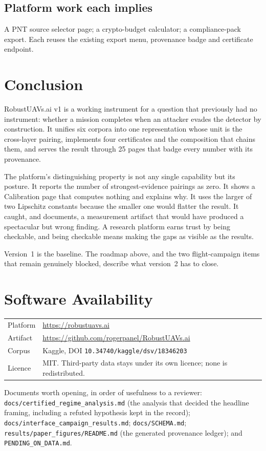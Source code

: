 \documentclass[11pt,a4paper]{article}
\newcommand{\code}[1]{\texttt{#1}}
\begin{document}
\subsection{Platform work each implies}
A PNT source selector page; a crypto-budget calculator; a compliance-pack
export. Each reuses the existing export menu, provenance badge and certificate
endpoint.

\section{Conclusion}

RobustUAVs.ai v1 is a working instrument for a question that previously had no
instrument: whether a mission completes when an attacker evades the detector by
construction. It unifies six corpora into one representation whose unit is the
cross-layer pairing, implements four certificates and the composition that
chains them, and serves the result through 25 pages that badge every number with
its provenance.

The platform's distinguishing property is not any single capability but its
posture. It reports the number of strongest-evidence pairings as zero. It shows
a Calibration page that computes nothing and explains why. It uses the larger of
two Lipschitz constants because the smaller one would flatter the result. It
caught, and documents, a measurement artifact that would have produced a
spectacular but wrong finding. A research platform earns trust by being
checkable, and being checkable means making the gaps as visible as the results.

Version~1 is the baseline. The roadmap above, and the two flight-campaign items
that remain genuinely blocked, describe what version~2 has to close.

\section*{Software Availability}

\begin{table}[H]
\centering\small
\begin{tabularx}{\linewidth}{@{}p{3.0cm}X@{}}
\toprule
Platform & \url{https://robustuavs.ai} \\
Artifact & \url{https://github.com/rogerpanel/RobustUAVs.ai} \\
Corpus & Kaggle, DOI \code{10.34740/kaggle/dsv/18346203} \\
Licence & MIT. Third-party data stays under its own licence; none is redistributed. \\
\bottomrule
\end{tabularx}
\end{table}

Documents worth opening, in order of usefulness to a reviewer:
\code{docs/certified\_regime\_analysis.md} (the analysis that decided the
headline framing, including a refuted hypothesis kept in the record);
\code{docs/interface\_campaign\_results.md}; \code{docs/SCHEMA.md};
\code{results/paper\_figures/README.md} (the generated provenance ledger); and
\code{PENDING\_ON\_DATA.md}.
\end{document}
